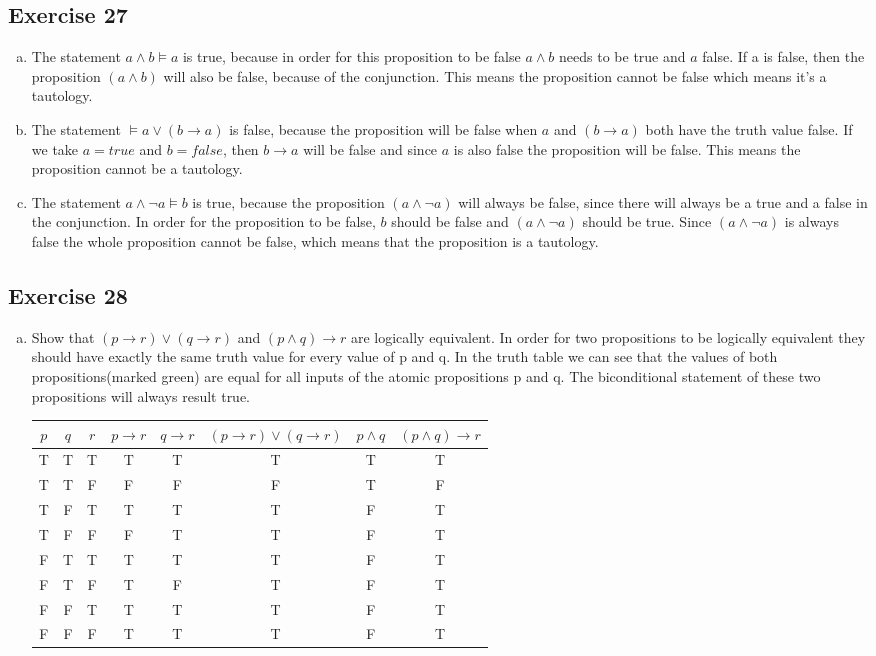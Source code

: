 \documentclass[a4paper]{article}
\newcommand{\exerciseenum}[2]{\subsection*{Exercise #1}{\begin{enumerate}[a)]#2\end{enumerate}}}
\begin{document}
\exerciseenum{27}{%
\item%
The statement
$a \land b \vDash a$
is true,
because in order for this proposition to be false $a \land b$ needs to be true and $a$ false. If a is false, then the proposition $(a \land b)$ will also be false, because of the conjunction. This means the proposition cannot be false which means it's a tautology.
\addtocounter{enumi}{1}
\item%
The statement
$\vDash a \lor  (b \to a)$
is false,
because the proposition will be false when $a$ and $(b \to a)$ both have the truth value false. If we take $a = true$ and $b = false$, then $b \to a$ will be false and since $a$ is also false the proposition will be false. This means the proposition cannot be a tautology.
\addtocounter{enumi}{2}
\item%
The statement
$a \land \neg a \vDash b$
is true,
because the proposition $(a \land \neg a)$ will always be false, since there will always be a true and a false in the conjunction. In order for the proposition to be false, $b$ should be false and $(a \land \neg a)$ should be true. Since $(a \land \neg a)$ is always false the whole proposition cannot be false, which means that the proposition is a tautology.
}

\exerciseenum{28}{%
    \item Show that $(p \to r) \lor (q \to r)$ and $(p \land q) \to r$ are logically equivalent.
    \newline
    In order for two propositions to be logically equivalent they should have exactly the same truth value for every value of p and q. In the truth table we can see that the values of both propositions(marked green) are equal for all inputs of the atomic propositions p and q. The biconditional statement of these two propositions will always result true.

    \begin{tabular}{c|c|c|c|c|c|c|c}
        $p$ & $q$ & $r$ & $p \to r$ & $q \to r$ & $(p \to r)\lor (q \to r)$ & $p \land q$ & $(p \land q)\to r$\\
        \hline
        T & T & T & T & T & {\color{green} T} & T & {\color{green} T}\\
        T & T & F & F & F & {\color{green} F} & T & {\color{green} F}\\
        T & F & T & T & T & {\color{green} T} & F & {\color{green} T}\\
        T & F & F & F & T & {\color{green} T} & F & {\color{green} T}\\
        F & T & T & T & T & {\color{green} T} & F & {\color{green} T}\\
        F & T & F & T & F & {\color{green} T} & F & {\color{green} T}\\
        F & F & T & T & T & {\color{green} T} & F & {\color{green} T}\\
        F & F & F & T & T & {\color{green} T} & F & {\color{green} T}\\
    \end{tabular}
}
\end{document}
